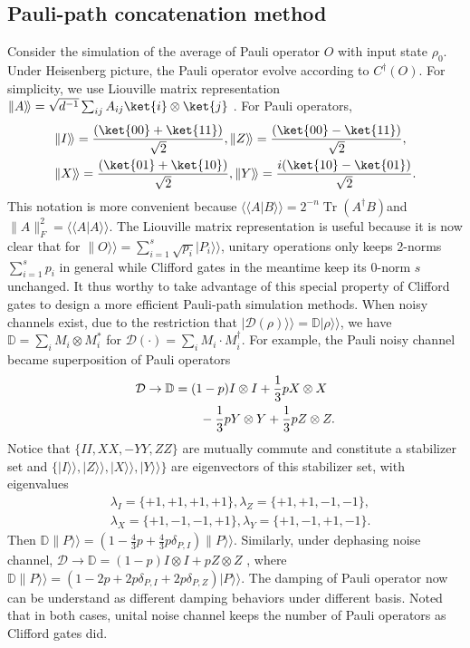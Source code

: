 \documentclass[aps,%
twocolumn,%
floatfix,%
pra,%
amsfonts,%
longbibliography,%
groupedaddress,%
superscriptaddress]{revtex4-2}%
\DeclareMathOperator{\tr}{Tr}
\newcommand{\1}{\mathbbm{1}}
\begin{document}
\subsection{Pauli-path concatenation method}
Consider the simulation of the average of Pauli operator $O$ with input state $\rho_0$. 
Under Heisenberg picture, the Pauli operator evolve according to $C^{\dagger}(O)$. 
For simplicity, we use Liouville matrix representation $ \|A\rangle\!\rangle= \sqrt{d^{-1}}\sum_{ij} A_{ij} \ket{i} \otimes \ket{j}$ .  For Pauli operators,
\begin{align}
    &\|I\rangle\!\rangle =\frac{(\ket{00} + \ket{11})}{\sqrt{2}}, \|Z\rangle\!\rangle=\frac{(\ket{00} - \ket{11})}{\sqrt{2}},\\
    & \|X\rangle\!\rangle =\frac{(\ket{01}+\ket{10})}{\sqrt{2}} ,\|Y\rangle\!\rangle = \frac{i(\ket{10} - \ket{01})}{\sqrt{2}}.
\end{align}
This notation is more convenient because $\langle \!\langle A|B\rangle\!\rangle = 2^{-n}\tr(A^\dagger B) $and $\|A\|_F^2 = \langle \!\langle A|A\rangle\!\rangle$. 
The Liouville matrix representation is useful because it is now clear that for $\|O\rangle\!\rangle = \sum_{i=1}^{s} \sqrt{p_i} |P_i\rangle\!\rangle$, unitary operations only keeps 2-norms $\sum_{i=1}^s p_i$ in general while Clifford gates in the meantime keep its 0-norm $s$ unchanged.  It thus worthy to take advantage of this special property of Clifford gates to design a more efficient Pauli-path simulation methods. 
When noisy channels exist, due to the restriction that $|\mathcal{D}(\rho)\rangle\!\rangle = \mathbb{D} |\rho\rangle\!\rangle$, we have $\mathbb{D} = \sum_i M_i \otimes M_i^*$ for $\mathcal{D}(\cdot) = \sum_i M_i \cdot M_i^{\dagger}$. 
For example, the Pauli noisy channel became superposition of Pauli operators
\begin{align}
    \mathcal{D} \to \mathbb{D} &= (1 - p) I \otimes I + \frac{1}{3} p X \otimes X \notag \\
    &\quad \quad  - \frac{1}{3} p Y \otimes Y + \frac{1}{3}p Z \otimes Z. 
\end{align}
Notice that $\{II,XX,-YY,ZZ\}$ are mutually commute and constitute a stabilizer set and $\{|I\rangle\!\rangle,|Z\rangle\!\rangle,|X\rangle\!\rangle,|Y\rangle\!\rangle\}$ are eigenvectors of this stabilizer set, with eigenvalues
\begin{align}
    &\lambda_{I} = \{+1,+1,+1,+1\}, \lambda_{Z} = \{+1,+1,-1,-1\},\\
    &\lambda_{X} = \{+1,-1,-1,+1\},\lambda_{Y} = \{+1,-1,+1,-1\}.
\end{align}
Then $\mathbb{D}\|P\rangle\!\rangle = (1 - \frac{4}{3}p + \frac{4}{3}p \delta_{P,I})\|P\rangle\!\rangle$. Similarly, under dephasing noise channel,  $\mathcal{D} \to \mathbb{D} = (1 - p) I \otimes I +  p Z \otimes Z$ , where $\mathbb{D}\|P\rangle\!\rangle = (1 - 2p + 2p \delta_{P,I}+2p \delta_{P,Z})|P\rangle\!\rangle$.
The damping of Pauli operator now can be understand as different damping behaviors under different basis. Noted that in both cases, unital noise channel keeps the number of Pauli operators as Clifford gates did.
\end{document}
